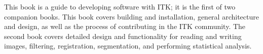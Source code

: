 This book is a guide to developing software with ITK; it is the first of two
companion books. This book covers building and installation, general
architecture and design, as well as the process of contributing in the ITK
community. The second book covers detailed design and functionality for
reading and writing images, filtering, registration, segmentation, and
performing statistical analysis.
